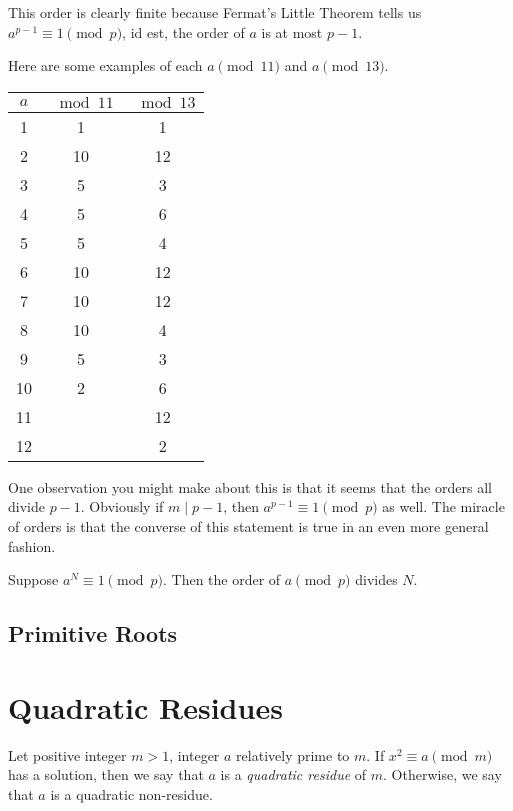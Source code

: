 \begin{remark}
This order is clearly finite because Fermat's Little Theorem tells us $a^{p-1} \equiv 1 \pmod p$, id est, the order of $a$ is at most $p-1$.
\end{remark}

\begin{example}
Here are some examples of each $a \pmod {11}$ and $a \pmod {13}$.
\begin{table}[H]
\centering
\begin{tabular}{c|cc}
$a$ & $\mod 11$ & $\mod 13$ \\
\hline
1 & 1 & 1 \\
2 & 10 & 12 \\
3 & 5 & 3 \\
4 & 5 & 6 \\
5 & 5 & 4 \\
6 & 10 & 12 \\
7 & 10 & 12 \\
8 & 10 & 4 \\
9 & 5 & 3 \\
10 & 2 & 6 \\
11 & & 12 \\
12 & & 2 \\
\end{tabular}
\end{table}
\end{example}

One observation you might make about this is that it seems that the orders all divide $p-1$. Obviously if $m\mid p-1$, then $a^{p-1}\equiv1\pmod p$ as well. The miracle of orders is that the converse of this statement is true in an even more general fashion.

\begin{theorem}
Suppose $a^N \equiv 1 \pmod p$. Then the order of $a \pmod p$ divides $N$.
\end{theorem}

\subsection{Primitive Roots}

\pagebreak

\section{Quadratic Residues}
\begin{definition}
Let positive integer $m>1$, integer $a$ relatively prime to $m$. If $x^2\equiv a\pmod m$ has a solution, then we say that $a$ is a \emph{quadratic residue} of $m$. Otherwise, we say that $a$ is a quadratic non-residue.
\end{definition}

